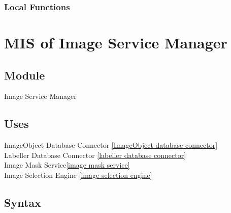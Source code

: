 \documentclass[12pt, titlepage]{article}
\begin{document}
  \subsubsection{Local Functions}

   
  

\newpage


\section{MIS of Image Service Manager }\label{image service manager}
  
  
  
  \subsection{Module}
  
  Image Service Manager
  
  \subsection{Uses}
  
  ImageObject Database Connector \ref{ImageObject database connector}\\
  Labeller Database Connector \ref{labeller database connector}\\
  Image Mask Service\ref{image mask service}\\
  Image Selection Engine \ref{image selection engine}\\

  \subsection{Syntax}
\end{document}
